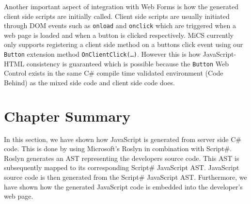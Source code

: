 	Another important aspect of integration with Web Forms is how the generated client side scripts are initially called. Client side scripts are usually initiated through DOM events such as \texttt{onload} and \texttt{onclick} which are triggered when a web page is loaded and when a button is clicked respectively. MiCS currently only supports registering a client side method on a buttons click event using our \texttt{Button} extension method \texttt{OnClientClick(…)}. However this is how JavaScript-HTML consistency is guaranteed which is possible because the \texttt{Button} Web Control exists in the same C\# compile time validated environment (Code Behind) as the mixed side code and client side code does.


\section{Chapter Summary} %
\label{sec:chapter_impl_summary}
	In this section, we have shown how JavaScript is generated from server side C\# code. This is done by using Microsoft's Roslyn in combination with Script\#. Roslyn generates an AST representing the developers source code. This AST is subsequently mapped to its corresponding Script\# JavaScript AST. JavaScript source code is then generated from the Script\# JavaScript AST. Furthermore, we have shown how the generated JavaScript code is embedded into the developer's web page.

